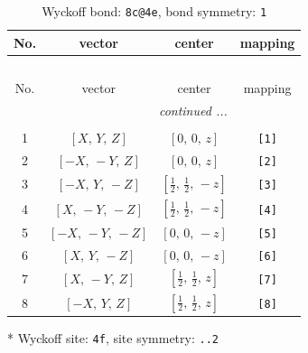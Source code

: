 \documentclass[fleqn,8pt]{jsarticle}
\begin{document}
\renewcommand{\arraystretch}{1.2}
\begin{longtable}{cccc}
\caption{Wyckoff bond: {\tt 8c@4e}, bond symmetry: {\tt 1}}
 \\
 \hline \hline
No. & vector & center & mapping \\ \hline \endfirsthead

\multicolumn{3}{l}{\tablename\ \thetable{}} \\
 \hline \hline
No. & vector & center & mapping \\ \hline \endhead

 \hline \hline
\multicolumn{3}{r}{\footnotesize\it continued ...} \\ \endfoot

 \hline \hline
\multicolumn{3}{r}{} \\ \endlastfoot

1 & $\left[ X,\, Y,\, Z \right]$ & $\left[ 0,\, 0,\, z \right]$ & {\tt [1]} \\ \hline
2 & $\left[ - X,\, - Y,\, Z \right]$ & $\left[ 0,\, 0,\, z \right]$ & {\tt [2]} \\ \hline
3 & $\left[ - X,\, Y,\, - Z \right]$ & $\left[ \frac{1}{2},\, \frac{1}{2},\, - z \right]$ & {\tt [3]} \\ \hline
4 & $\left[ X,\, - Y,\, - Z \right]$ & $\left[ \frac{1}{2},\, \frac{1}{2},\, - z \right]$ & {\tt [4]} \\ \hline
5 & $\left[ - X,\, - Y,\, - Z \right]$ & $\left[ 0,\, 0,\, - z \right]$ & {\tt [5]} \\ \hline
6 & $\left[ X,\, Y,\, - Z \right]$ & $\left[ 0,\, 0,\, - z \right]$ & {\tt [6]} \\ \hline
7 & $\left[ X,\, - Y,\, Z \right]$ & $\left[ \frac{1}{2},\, \frac{1}{2},\, z \right]$ & {\tt [7]} \\ \hline
8 & $\left[ - X,\, Y,\, Z \right]$ & $\left[ \frac{1}{2},\, \frac{1}{2},\, z \right]$ & {\tt [8]} \\
\end{longtable}
* Wyckoff site: {\tt 4f}, site symmetry: {\tt ..2}
\renewcommand{\arraystretch}{1.2}
\end{document}
